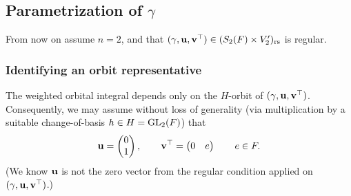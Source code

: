 \subsection{Parametrization of $\gamma$}
From now on assume $n = 2$,
and that $(\gamma, \mathbf u, \mathbf v^\top) \in (S_2(F) \times V'_2)_{\mathrm{rs}}$ is regular.

\subsubsection{Identifying an orbit representative}
The weighted orbital integral depends only on the $H$-orbit of $(\gamma, \mathbf u, \mathbf v^\top)$.
Consequently, we may assume without loss of generality
(via multiplication by a suitable change-of-basis $h \in H = \operatorname{GL}_2(F)$) that
\[ \mathbf u = \begin{pmatrix} 0 \\ 1 \end{pmatrix}, \qquad
  \mathbf v^\top = \begin{pmatrix} 0 & e \end{pmatrix} \qquad e \in F. \]
(We know $\mathbf u$ is not the zero vector from the regular condition
applied on $(\gamma, \mathbf u, \mathbf v^\top)$.)

